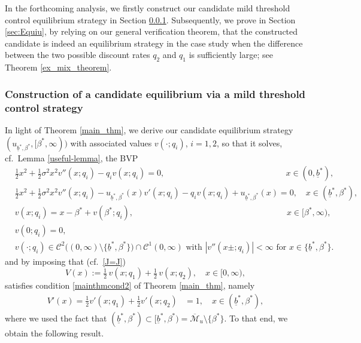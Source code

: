 \documentclass[11pt]{article} %
\def\ub{\underline{b}}
\numberwithin{komcounter}{section}
\begin{document}
In the forthcoming analysis, we firstly construct our candidate mild threshold control equilibrium strategy in Section \ref{sec:inform-mild}. 
Subsequently, we prove in Section \ref{sec:Equiu}, by relying on our general verification theorem, that the constructed candidate is indeed an equilibrium strategy in the case study when the difference between the two possible discount rates $q_2$ and $q_1$ is sufficiently large; see Theorem \ref{ex_mix_theorem}. 



\subsubsection{Construction of a candidate equilibrium via a mild threshold control strategy}
\label{sec:inform-mild}

In light of Theorem \ref{main_thm}, we derive our candidate equilibrium strategy $(u_{\ub^*,\beta^*},[\beta^*,\infty))$ with associated values $v(\cdot;q_i)$, $i=1,2$, so that it solves, cf.~Lemma \ref{useful-lemma}, the BVP
\begin{align}
&\tfrac12 x^2 + \tfrac12 \sigma^2 x^2 v''(x;q_i) - q_i v(x;q_i) = 0, \qquad \qquad \qquad \qquad \qquad \qquad \qquad \;\, x \in (0,\ub^*), 
\label{XBVPaa}\\
&\tfrac12 x^2 + \tfrac12 \sigma^2 x^2 v''(x;q_i) - u_{\ub^*,\beta^*}(x) v'(x;q_i) - q_i v(x;q_i) + u_{\ub^*,\beta^*}(x) = 0, \quad x \in (\ub^*,\beta^*), 
\label{XBVPaaa}\\
&v(x;q_i) = x - \beta^* + v(\beta^*;q_i), \qquad \qquad \qquad \qquad \qquad \qquad \qquad \qquad \qquad \; x \in [\beta^*,\infty), 
\label{XBVPab}\\
&v(0;q_i) = 0, 
\label{XBVPac}\\
& \text{$v(\cdot;q_i)\in \mathcal{C}^2\big( (0,\infty) \setminus \{\ub^*, \beta^*\} \big) \cap \mathcal{C}^1(0,\infty)$ with $|v''(x\pm;q_i)|<\infty$ for $x\in\{\ub^*,\beta^*\}$}.
\label{XBVPad}
\end{align} 
and by imposing that (cf.~\eqref{J=J}) 
\begin{equation} \label{J_mild_def}
V(x) := \tfrac12 \, v(x; q_1) + \tfrac12 \, v(x; q_2), \quad x \in [0,\infty),
\end{equation} 
satisfies condition \eqref{mainthmcond2} of Theorem \ref{main_thm}, namely 
\begin{align} \label{eq_ex_1} 
V'(x) = \tfrac{1}{2} v'(x;q_1) + \tfrac{1}{2} v'(x;q_2) &= 1, \quad x \in (\ub^*, \beta^*), 
\end{align}
where we used the fact that $(\ub^*,\beta^*) \subset [\ub^*,\beta^*) = \overline{\mathcal{M}}_{u} \setminus \{\beta^*\}$.
To that end, we obtain the following result. 
\end{document}
